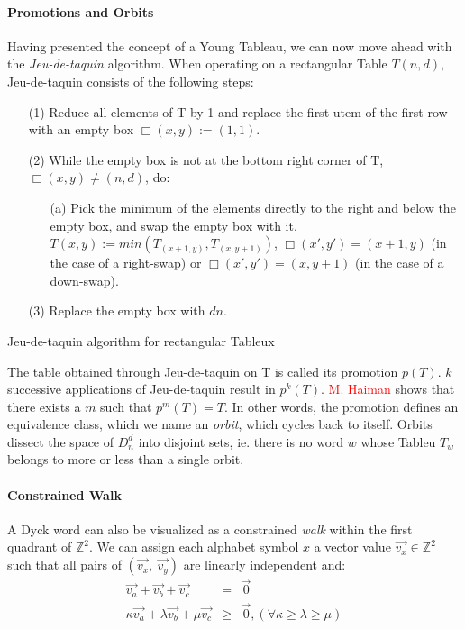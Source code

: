\documentclass[nonatbib,numbers,10pt]{sigplanconf}
\newcommand\todo[1]{\textcolor{red}{#1}}
\begin{document}
\paragraph{Promotions and Orbits}
Having presented the concept of a Young Tableau, we can now move ahead with the \textit{Jeu-de-taquin} algorithm. When operating on a rectangular Table $T(n,d)$, Jeu-de-taquin consists of the following steps:
\begin{table}[h!]
\begin{enumerate}
\item[(1)] Reduce all elements of T by 1 and replace the first utem of the first row with an empty box $ \Box (x,y) := (1,1)$. 
\item[(2)] While the empty box is not at the bottom right corner of T, $ \Box(x,y) \neq (n,d)$, do:
\begin{enumerate}
\item[(a)] Pick the minimum of the elements directly to the right and below the empty box, and swap the empty box with it. $ T(x, y) := min(T_{(x+1,y)}, T_{(x,y+1)})$, $ \Box (x',y') = (x+1, y)$ (in the case of a right-swap) or $\Box (x',y') = (x,y+1)$ (in the case of a down-swap).
\end{enumerate}
\item[(3)] Replace the empty box with $dn$.
\end{enumerate}
\caption{Jeu-de-taquin algorithm for rectangular Tableux}
\end{table}

The table obtained through Jeu-de-taquin on T is called its promotion $p(T)$. $k$ successive applications of Jeu-de-taquin result in $p^k(T)$. \todo{M. Haiman} shows that there exists a $m$ such that $p^m(T)=T$. In other words, the promotion defines an equivalence class, which we name an \textit{orbit}, which cycles back to itself. Orbits dissect the space of $D^d_n$ into disjoint sets, ie. there is no word $w$ whose Tableu $T_w$ belongs to more or less than a single orbit. 
\paragraph{Constrained Walk}
A Dyck word can also be visualized as a constrained \textit{walk} within the first quadrant of $\mathbb{Z}^2$. We can assign each alphabet symbol $x$ a vector value $\vec{v_x} \in \mathbb{Z}^2$ such that all pairs of $(\vec{v_x},\ \vec{v_y})$ are linearly independent and:
\begin{eqnarray}
\vec{v_a} + \vec{v_b} + \vec{v_c} &=& \vec{0} \\
\kappa\vec{v_a} + \lambda\vec{v_b} + \mu\vec{v_c} &\geq & \vec{0},  (\forall \kappa \geq \lambda \geq \mu)
\end{eqnarray}
\end{document}
